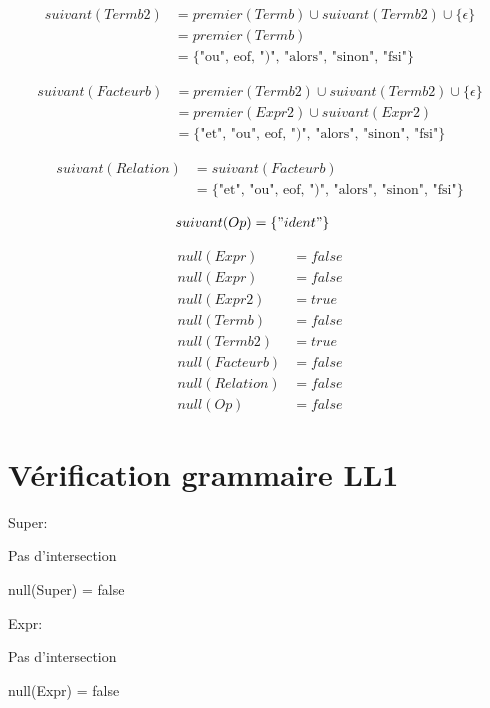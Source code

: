 \documentclass[a4paper,12pt]{article}
\begin{document}
\begin{align*}
suivant(Termb2) &= premier(Termb) \cup suivant(Termb2) \cup \{\epsilon\} \\
        &= premier(Termb) \\
        &= \{\text{"ou", eof, ")", "alors", "sinon", "fsi"}\}
\end{align*}

\begin{align*}
suivant(Facteurb)   &= premier(Termb2) \cup suivant(Termb2) \cup \{\epsilon\} \\
          &= premier(Expr2) \cup suivant(Expr2) \\
          &= \{\text{"et", "ou", eof, ")", "alors", "sinon", "fsi"}\}
\end{align*}

\begin{align*}
suivant(Relation) &= suivant(Facteurb) \\
          &= \{\text{"et", "ou", eof, ")", "alors", "sinon", "fsi"}\}
\end{align*}

\begin{align*}
suivant(Op) &= \{"ident"\}
\end{align*}

\begin{align*}
null(Expr)       &= false  \\
null(Expr)        &= false  \\
null(Expr2)       &= true \\
null(Termb)       &= false \\
null(Termb2)      &= true \\
null(Facteurb)    &= false \\
null(Relation)    &= false \\
null(Op)          &= false
\end{align*}


\section{Vérification grammaire LL1}


\noindent Super:

  Pas d'intersection

  null(Super) = false

  \medskip

\noindent Expr:

  Pas d'intersection

  null(Expr) = false
\end{document}
